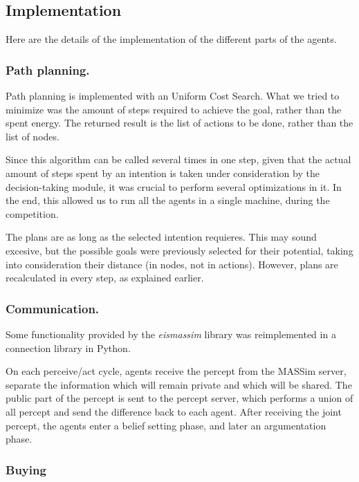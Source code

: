 \documentclass{llncs2e/llncs}
\begin{document}
\subsection{Implementation}

    Here are the details of the implementation of the different parts of the
    agents.

\subsubsection{Path planning.}

    Path planning is implemented with an Uniform Cost Search. What we tried to 
    minimize was the amount of steps required to achieve the goal, rather than the 
    spent energy. The returned result is the list of actions to be done, rather 
    than the list of nodes.
    
    Since this algorithm can be called several times in one step, given that the 
    actual amount of steps spent by an intention is taken under consideration by 
    the decision-taking module, it was crucial to perform several optimizations in 
    it. In the end, this allowed us to run all the agents in a single machine, 
    during the competition.
    
    The plans are as long as the selected intention requieres. This may 
    sound excesive, but the possible goals were previously selected for their 
    potential, taking into consideration their distance (in nodes, not in 
    actions). However, plans are recalculated in every step, as explained earlier.

\subsubsection{Communication.}

    Some functionality provided by the \textit{eismassim} library was
    reimplemented in a connection library in Python.

    On each perceive/act cycle, agents receive the percept from the MASSim server, 
    separate the information which will remain private and which will be shared. 
    The public part of the percept is sent to the percept server, which performs a 
    union of all percept and send the difference back to each agent. After 
    receiving the joint percept, the agents enter a belief setting phase, and 
    later an argumentation phase.
    
\subsubsection{Buying}
\end{document}
